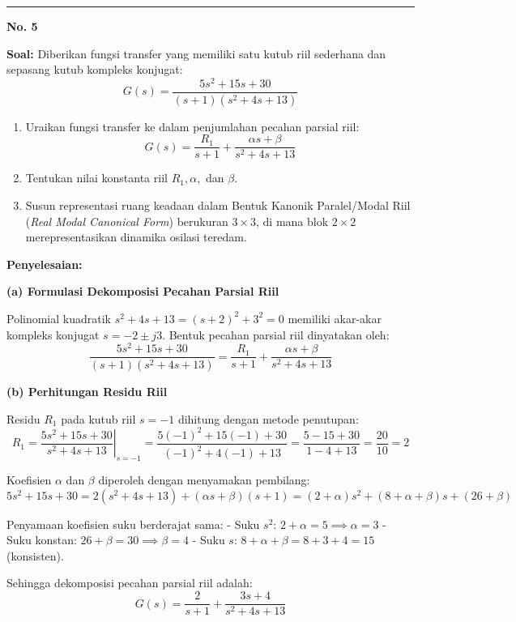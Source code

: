 \documentclass[11pt,a4paper]{article}
\begin{document}
\vspace{12pt}
\hrule
\vspace{10pt}

\textbf{\large No. 5}

\textbf{Soal:}  
Diberikan fungsi transfer yang memiliki satu kutub riil sederhana dan sepasang kutub kompleks konjugat:
$$G(s) = \frac{5s^2 + 15s + 30}{(s+1)(s^2 + 4s + 13)}$$
\begin{enumerate}[label=(\alph*)]
    \item Uraikan fungsi transfer ke dalam penjumlahan pecahan parsial riil:
    $$G(s) = \frac{R_1}{s+1} + \frac{\alpha s + \beta}{s^2 + 4s + 13}$$
    \item Tentukan nilai konstanta riil $R_1, \alpha,$ dan $\beta$.
    \item Susun representasi ruang keadaan dalam Bentuk Kanonik Paralel/Modal Riil (\textit{Real Modal Canonical Form}) berukuran $3 \times 3$, di mana blok $2 \times 2$ merepresentasikan dinamika osilasi teredam.
\end{enumerate}

\textbf{Penyelesaian:}

\textbf{(a) Formulasi Dekomposisi Pecahan Parsial Riil}

Polinomial kuadratik $s^2 + 4s + 13 = (s+2)^2 + 3^2 = 0$ memiliki akar-akar kompleks konjugat $s = -2 \pm j3$. Bentuk pecahan parsial riil dinyatakan oleh:
$$\frac{5s^2 + 15s + 30}{(s+1)(s^2 + 4s + 13)} = \frac{R_1}{s+1} + \frac{\alpha s + \beta}{s^2 + 4s + 13}$$

\textbf{(b) Perhitungan Residu Riil}

Residu $R_1$ pada kutub riil $s = -1$ dihitung dengan metode penutupan:
$$R_1 = \left. \frac{5s^2 + 15s + 30}{s^2 + 4s + 13} \right|_{s=-1} = \frac{5(-1)^2 + 15(-1) + 30}{(-1)^2 + 4(-1) + 13} = \frac{5 - 15 + 30}{1 - 4 + 13} = \frac{20}{10} = 2$$

Koefisien $\alpha$ dan $\beta$ diperoleh dengan menyamakan pembilang:
$$5s^2 + 15s + 30 = 2(s^2 + 4s + 13) + (\alpha s + \beta)(s+1) = (2+\alpha)s^2 + (8 + \alpha + \beta)s + (26 + \beta)$$

Penyamaan koefisien suku berderajat sama:
- Suku $s^2$: $2 + \alpha = 5 \implies \alpha = 3$
- Suku konstan: $26 + \beta = 30 \implies \beta = 4$
- Suku $s$: $8 + \alpha + \beta = 8 + 3 + 4 = 15$ (konsisten).

Sehingga dekomposisi pecahan parsial riil adalah:
$$G(s) = \frac{2}{s+1} + \frac{3s + 4}{s^2 + 4s + 13}$$
\end{document}
